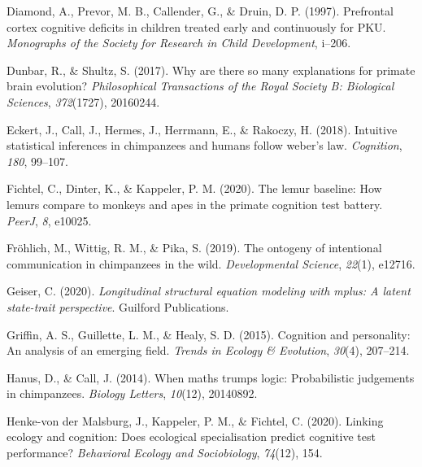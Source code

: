 \documentclass[
  man,floatsintext]{apa6}
\newlength{\cslhangindent}
\newlength{\cslentryspacingunit} %
\newenvironment{CSLReferences}[2] %
 {%
  \setlength{\parindent}{0pt}
  \ifodd #1
  \let\oldpar\par
  \def\par{\hangindent=\cslhangindent\oldpar}
  \fi
  \setlength{\parskip}{#2\cslentryspacingunit}
 }%
 {}
\begin{document}
\begin{CSLReferences}{1}{0}
\leavevmode{}%
Diamond, A., Prevor, M. B., Callender, G., \& Druin, D. P. (1997). Prefrontal cortex cognitive deficits in children treated early and continuously for PKU. \emph{Monographs of the Society for Research in Child Development}, i--206.

\leavevmode{}%
Dunbar, R., \& Shultz, S. (2017). Why are there so many explanations for primate brain evolution? \emph{Philosophical Transactions of the Royal Society B: Biological Sciences}, \emph{372}(1727), 20160244.

\leavevmode{}%
Eckert, J., Call, J., Hermes, J., Herrmann, E., \& Rakoczy, H. (2018). Intuitive statistical inferences in chimpanzees and humans follow weber's law. \emph{Cognition}, \emph{180}, 99--107.

\leavevmode{}%
Fichtel, C., Dinter, K., \& Kappeler, P. M. (2020). The lemur baseline: How lemurs compare to monkeys and apes in the primate cognition test battery. \emph{PeerJ}, \emph{8}, e10025.

\leavevmode{}%
Fröhlich, M., Wittig, R. M., \& Pika, S. (2019). The ontogeny of intentional communication in chimpanzees in the wild. \emph{Developmental Science}, \emph{22}(1), e12716.

\leavevmode{}%
Geiser, C. (2020). \emph{Longitudinal structural equation modeling with mplus: A latent state-trait perspective}. Guilford Publications.

\leavevmode{}%
Griffin, A. S., Guillette, L. M., \& Healy, S. D. (2015). Cognition and personality: An analysis of an emerging field. \emph{Trends in Ecology \& Evolution}, \emph{30}(4), 207--214.

\leavevmode{}%
Hanus, D., \& Call, J. (2014). When maths trumps logic: Probabilistic judgements in chimpanzees. \emph{Biology Letters}, \emph{10}(12), 20140892.

\leavevmode{}%
Henke-von der Malsburg, J., Kappeler, P. M., \& Fichtel, C. (2020). Linking ecology and cognition: Does ecological specialisation predict cognitive test performance? \emph{Behavioral Ecology and Sociobiology}, \emph{74}(12), 154.


\end{CSLReferences}
\end{document}
